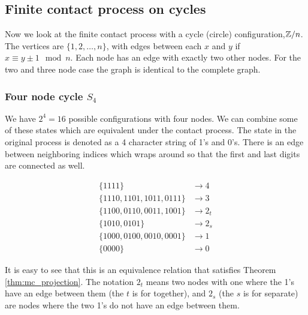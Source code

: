 \subsection{Finite contact process on cycles}

Now we look at the finite contact process with a cycle (circle) configuration,$\mathbb{Z}/n$. The vertices are $\{1, 2,\ldots, n\}$, with edges between each $x$ and $y$ if $x \equiv y \pm 1 \mod n$.
Each node has an edge with exactly two other nodes.
For the two and three node case the graph is identical to the complete graph.


\subsubsection{Four node cycle \texorpdfstring{$S_4$}{S4}}
We have $2^4 = 16$ possible configurations with four nodes.
We can combine some of these states which are equivalent under the contact process.
The state in the original process is denoted as a 4 character string of 1's and 0's.
There is an edge between neighboring indices which wraps around so that the first and last digits are connected as well.

\begin{align*}
    \{1111\} &\to 4\\
    \{1110, 1101, 1011, 0111\} &\to 3\\
    \{1100, 0110, 0011, 1001\} &\to 2_t\\
    \{1010, 0101\} &\to 2_s\\
    \{1000, 0100, 0010, 0001\} &\to 1\\
    \{0000\} &\to 0
\end{align*}

It is easy to see that this is an equivalence relation that satisfies Theorem \ref{thm:mc_projection}.
The notation $2_t$ means two nodes with one where the 1's have an edge between them (the $t$ is for together),
and $2_s$ (the $s$ is for separate) are nodes where the two 1's do not have an edge between them.


